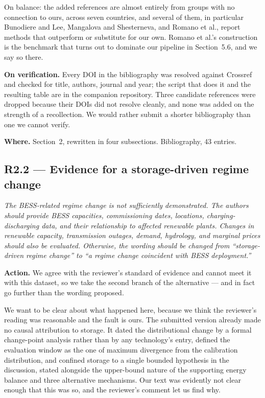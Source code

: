 \documentclass[11pt,a4paper]{article}
\newenvironment{revcomment}
  {\begin{mdframed}[backgroundcolor=quotebg,linecolor=quoterule,linewidth=0.4pt,
    innertopmargin=6pt,innerbottommargin=6pt,skipabove=8pt,skipbelow=8pt]\itshape}
  {\end{mdframed}}
\newcommand{\action}[1]{\textbf{Action.} #1}
\newcommand{\where}[1]{\textbf{Where.} #1}
\begin{document}
On balance: the added references are almost entirely from groups with no connection to ours, across seven countries, and several of them, in particular Bunodiere and Lee, Mangalova and Shesterneva, and Romano et al., report methods that outperform or substitute for our own. Romano et al.'s construction is the benchmark that turns out to dominate our pipeline in Section~5.6, and we say so there.

\textbf{On verification.} Every DOI in the bibliography was resolved against Crossref and checked for title, authors, journal and year; the script that does it and the resulting table are in the companion repository. Three candidate references were dropped because their DOIs did not resolve cleanly, and none was added on the strength of a recollection. We would rather submit a shorter bibliography than one we cannot verify.

\where{Section~2, rewritten in four subsections. Bibliography, 43 entries.}

\subsection*{R2.2 --- Evidence for a storage-driven regime change}

\begin{revcomment}
The BESS-related regime change is not sufficiently demonstrated. The authors should provide BESS capacities, commissioning dates, locations, charging-discharging data, and their relationship to affected renewable plants. Changes in renewable capacity, transmission outages, demand, hydrology, and marginal prices should also be evaluated. Otherwise, the wording should be changed from ``storage-driven regime change'' to ``a regime change coincident with BESS deployment.''
\end{revcomment}

\action{We agree with the reviewer's standard of evidence and cannot meet it with this dataset, so we take the second branch of the alternative --- and in fact go further than the wording proposed.}

We want to be clear about what happened here, because we think the reviewer's reading was reasonable and the fault is ours. The submitted version already made no causal attribution to storage. It dated the distributional change by a formal change-point analysis rather than by any technology's entry, defined the evaluation window as the one of maximum divergence from the calibration distribution, and confined storage to a single bounded hypothesis in the discussion, stated alongside the upper-bound nature of the supporting energy balance and three alternative mechanisms. Our text was evidently not clear enough that this was so, and the reviewer's comment let us find why.
\end{document}
